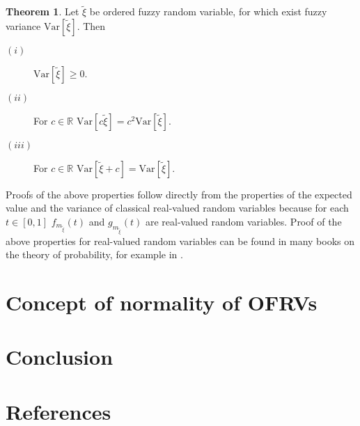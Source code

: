 \documentclass[review]{elsarticle}
\theoremstyle{definition}
\theoremstyle{theorem}
\newtheorem{theorem}{Theorem}[section]
\begin{document}
\begin{theorem}
Let $\tilde{\xi}$ be ordered fuzzy random variable, for which exist fuzzy variance $\mathrm{Var}[\tilde{\xi}]$. Then
\begin{description}
\item[$(i)$] $\mathrm{Var}[\tilde{\xi}]\geq 0$.
\item[$(ii)$] For $c\in\mathbb{R}$ $\mathrm{Var}[c\tilde{\xi}]=c^2\mathrm{Var}[\tilde{\xi}]$.
\item[$(iii)$] For $c\in\mathbb{R}$ $\mathrm{Var}[\tilde{\xi} + c]=\mathrm{Var}[\tilde{\xi}]$.
\end{description} 
\end{theorem}

Proofs of the above properties follow directly from the properties of the expected value and the variance of classical real-valued random variables because for each $t\in[0,1]$ $f_{m_{\tilde{\xi}}}(t)$ and $g_{m_{\tilde{\xi}}}(t)$ are real-valued random variables. Proof of the above properties for real-valued random variables can be found in many books on the theory of probability, for example in \cite{prob2003}.

\section{Concept of normality of OFRVs}

\section{Conclusion}

\section*{References}


\end{document}
